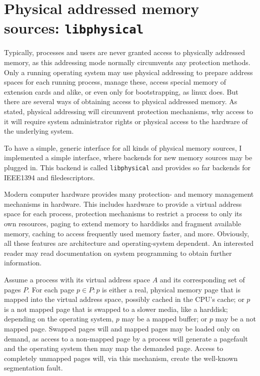 %
%

\section{Physical addressed memory sources: \texttt{libphysical}}

Typically, processes and users are never granted access to physically addressed
memory, as this addressing mode normally circumvents any protection methods.
Only a running operating system may use physical addressing to prepare address
spaces for each running process, manage these, access special memory of
extension cards and alike, or even only for bootstrapping, as linux does. But
there are several ways of obtaining access to physical addressed memory. As
stated, physical addressing will circumvent protection mechanisms, why access to
it will require system administrator rights or physical access to the hardware
of the underlying system.

To have a simple, generic interface for all kinds of physical memory sources, I
implemented a simple interface, where backends for new memory sources may be
plugged in. This backend is called \texttt{libphysical} and provides so far
backends for IEEE1394 and filedescriptors.

Modern computer hardware provides many protection- and memory management
mechanisms in hardware. This includes hardware to provide a virtual address
space for each process, protection mechanisms to restrict a process to only its
own resources, paging to extend memory to harddisks and fragment available
memory, caching to access frequently used memory faster, and more. Obviously,
all these features are architecture and operating-system dependent. An
interested reader may read documentation on system programming to obtain further
information.

Assume a process with its virtual address space $A$ and its corresponding set
of pages $P$. For each page $p \in P: p$ is either a real, physical memory page
that is mapped into the virtual address space, possibly cached in the CPU's
cache; or $p$ is a not mapped page that is swapped to a slower media, like a
harddisk; depending on the operating system, $p$ may be a mapped buffer; or $p$
may be a not mapped page. Swapped pages will and mapped pages may be loaded
only on demand, as access to a non-mapped page by a process will generate a
pagefault and the operating system then may map the demanded page.  Access to
completely unmapped pages will, via this mechanism, create the well-known
segmentation fault.

